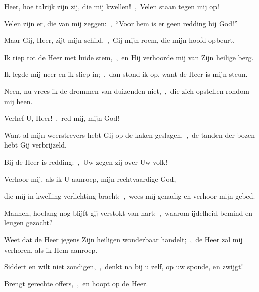 \documentclass[12pt,twoside,a5paper]{article}
\begin{document}


\begin{halfparskip}
  Heer, hoe talrijk zijn zij, die mij kwellen!~\sep\ Velen staan tegen mij op!


  Velen zijn er, die van mij zeggen:~\sep\ ``Voor hem is er geen redding bij God!''

  Maar Gij, Heer, zijt mijn schild,~\sep\ Gij mijn roem, die mijn hoofd opbeurt.
\end{halfparskip}


\begin{halfparskip}
  Ik riep tot de Heer met luide stem,~\sep\ en Hij verhoorde mij van Zijn heilige berg.

  Ik legde mij neer en ik sliep in;~\sep\ dan stond ik op, want de Heer is mijn steun.

  Neen, nu vrees ik de drommen van duizenden niet,~\sep\ die zich opstellen rondom mij heen.

  Verhef U, Heer!~\sep\ red mij, mijn God!

  Want al mijn weerstrevers hebt Gij op de kaken geslagen,~\sep\ de tanden der bozen hebt Gij verbrijzeld.

Bij de Heer is redding:~\sep\ Uw zegen zij over Uw volk!
\end{halfparskip}


\begin{halfparskip}
  Verhoor mij, als ik U aanroep, mijn rechtvaardige God,


  die mij in kwelling verlichting bracht;~\sep\ wees mij genadig en verhoor mijn gebed.
\end{halfparskip}


\begin{halfparskip}
  Mannen, hoelang nog blijft gij verstokt van hart;~\sep\ waarom ijdelheid bemind en leugen gezocht?

  Weet dat de Heer jegens Zijn heiligen wonderbaar handelt;~\sep\ de Heer zal mij verhoren, als ik Hem aanroep.

  Siddert en wilt niet zondigen,~\sep\ denkt na bij u zelf, op uw sponde, en zwijgt!

  Brengt gerechte offers,~\sep\ en hoopt op de Heer.
\end{halfparskip}
\end{document}

